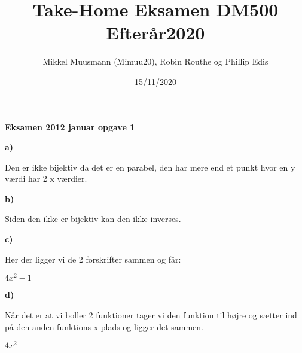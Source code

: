 \documentclass{article}
\title{\textbf{Take-Home Eksamen DM500 Efterår2020}}
\author{Mikkel Muusmann (Mimuu20), Robin Routhe og Phillip Edis}
\date{15/11/2020}
\begin{document}
\maketitle

\textbf{Eksamen 2012 januar opgave 1}

\textbf{a)}

Den er ikke bijektiv da det er en parabel, den har mere end et punkt
hvor en y værdi har 2 x værdier. 

\textbf{b)}

Siden den ikke er bijektiv kan den ikke inverses.

\textbf{c)}

Her der ligger vi de 2 forskrifter sammen og får:

$4x^2-1$

\textbf{d)}

Når det er at vi boller 2 funktioner tager vi den funktion til højre og sætter ind på den anden funktions x plads og ligger det sammen.

$4x^2$
\end{document}
